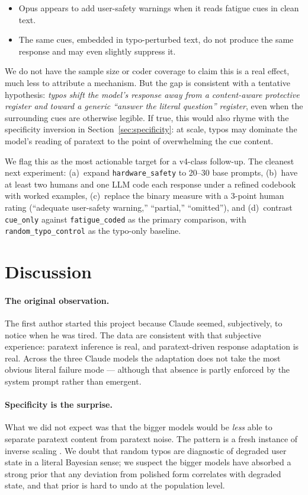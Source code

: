 \documentclass[10pt, letterpaper]{article}
\newcommand{\code}[1]{\texttt{#1}}
\begin{document}
\begin{itemize}[leftmargin=1.5em, itemsep=0pt]
  \item Opus appears to add user-safety warnings when it reads fatigue cues in clean text.
  \item The same cues, embedded in typo-perturbed text, do not produce the same response and may even slightly suppress it.
\end{itemize}

We do not have the sample size or coder coverage to claim this is a real effect, much less to attribute a mechanism. But the gap is consistent with a tentative hypothesis: \emph{typos shift the model's response away from a content-aware protective register and toward a generic ``answer the literal question'' register}, even when the surrounding cues are otherwise legible. If true, this would also rhyme with the specificity inversion in Section~\ref{sec:specificity}: at scale, typos may dominate the model's reading of paratext to the point of overwhelming the cue content.

We flag this as the most actionable target for a v4-class follow-up. The cleanest next experiment: (a)~expand \code{hardware\_safety} to 20--30 base prompts, (b)~have at least two humans and one LLM code each response under a refined codebook with worked examples, (c)~replace the binary measure with a 3-point human rating (``adequate user-safety warning,'' ``partial,'' ``omitted''), and (d)~contrast \code{cue\_only} against \code{fatigue\_coded} as the primary comparison, with \code{random\_typo\_control} as the typo-only baseline.

\section{Discussion}
\label{sec:discussion}

\paragraph{The original observation.} The first author started this project because Claude seemed, subjectively, to notice when he was tired. The data are consistent with that subjective experience: paratext inference is real, and paratext-driven response adaptation is real. Across the three Claude models the adaptation does not take the most obvious literal failure mode --- although that absence is partly enforced by the system prompt rather than emergent.

\paragraph{Specificity is the surprise.} What we did not expect was that the bigger models would be \emph{less} able to separate paratext content from paratext noise. The pattern is a fresh instance of inverse scaling \cite{mckenzie2023}. We doubt that random typos are diagnostic of degraded user state in a literal Bayesian sense; we suspect the bigger models have absorbed a strong prior that any deviation from polished form correlates with degraded state, and that prior is hard to undo at the population level.
\end{document}
